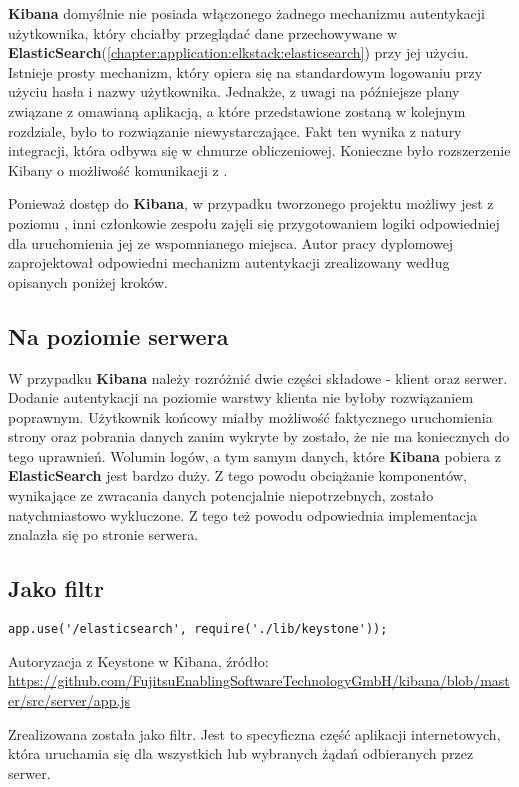 \textbf{Kibana} domyślnie nie posiada włączonego żadnego mechanizmu autentykacji użytkownika, który
chciałby przeglądać dane przechowywane w \textbf{ElasticSearch}(\ref{chapter:application:elkstack:elasticsearch})
przy jej użyciu. Istnieje prosty mechanizm, który opiera się na standardowym logowaniu przy użyciu
hasła i nazwy użytkownika. Jednakże, z uwagi na późniejsze plany związane z omawianą aplikacją, a które 
przedstawione zostaną w kolejnym rozdziale, było to rozwiązanie niewystarczające. Fakt ten wynika z natury
integracji, która odbywa się w chmurze obliczeniowej. Konieczne było rozszerzenie Kibany o możliwość
komunikacji z .

Ponieważ dostęp do \textbf{Kibana}, w przypadku tworzonego projektu możliwy jest z poziomu , inni
członkowie zespołu zajęli się przygotowaniem logiki odpowiedniej dla uruchomienia jej ze wspomnianego miejsca. Autor pracy 
dyplomowej zaprojektował odpowiedni mechanizm autentykacji zrealizowany według opisanych poniżej kroków.

    \subsection{Na poziomie serwera}
    W przypadku \textbf{Kibana} należy rozróżnić dwie części składowe - klient oraz serwer. Dodanie autentykacji
    na poziomie warstwy klienta nie byłoby rozwiązaniem poprawnym. Użytkownik końcowy miałby możliwość faktycznego
    uruchomienia strony oraz pobrania danych zanim wykryte by zostało, że nie ma koniecznych do tego uprawnień.
    Wolumin logów, a tym samym danych, które \textbf{Kibana} pobiera z \textbf{ElasticSearch} jest bardzo duży.
    Z tego powodu obciążanie komponentów, wynikające ze zwracania danych potencjalnie niepotrzebnych, zostało
    natychmiastowo wykluczone. Z tego też powodu odpowiednia implementacja znalazła się po stronie serwera.
    
    \subsection{Jako filtr}
    \begin{listing}
        \begin{verbatim}
app.use('/elasticsearch', require('./lib/keystone'));
        \end{verbatim}
        \label{chapter:application_own:own_work:kibana_and_keystone:filter_code}
        \caption[Autoryzacja z Keystone w Kibana]{Autoryzacja z Keystone w Kibana, źródło: \url{https://github.com/FujitsuEnablingSoftwareTechnologyGmbH/kibana/blob/master/src/server/app.js}}
    \end{listing}
    Zrealizowana została jako filtr. Jest to specyficzna część aplikacji internetowych, która
    uruchamia się dla wszystkich lub wybranych żądań odbieranych przez serwer.
    
